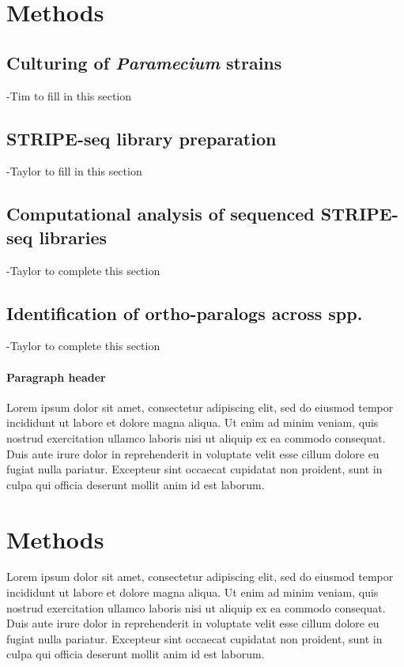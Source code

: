 \documentclass[nogrid]{MBE}%
\begin{document}
\section{Methods}

\subsection{Culturing of \textit{Paramecium} strains}
-Tim to fill in this section

\subsection{STRIPE-seq library preparation}
-Taylor to fill in this section

\subsection{Computational analysis of sequenced STRIPE-seq libraries}
-Taylor to complete this section

\subsection{Identification of ortho-paralogs across  spp.}
-Taylor to complete this section

\paragraph{Paragraph header} 

Lorem ipsum dolor sit amet, consectetur adipiscing elit, sed do eiusmod tempor incididunt ut labore et dolore magna aliqua. Ut enim ad minim veniam, quis nostrud exercitation ullamco laboris nisi ut aliquip ex ea commodo consequat. Duis aute irure dolor in reprehenderit in voluptate velit esse cillum dolore eu fugiat nulla pariatur. Excepteur sint occaecat cupidatat non proident, sunt in culpa qui officia deserunt mollit anim id est laborum.

\section{{Methods}\label{sec:Methods}}

Lorem ipsum dolor sit amet, consectetur adipiscing elit, sed do eiusmod tempor incididunt ut labore et dolore magna aliqua. Ut enim ad minim veniam, quis nostrud exercitation ullamco laboris nisi ut aliquip ex ea commodo consequat. Duis aute irure dolor in reprehenderit in voluptate velit esse cillum dolore eu fugiat nulla pariatur. Excepteur sint occaecat cupidatat non proident, sunt in culpa qui officia deserunt mollit anim id est laborum.
\end{document}

